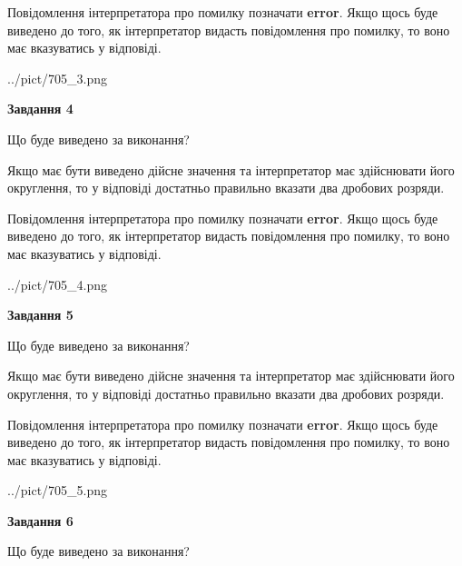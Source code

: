 \documentclass[12pt, ukrainian]{article}
\begin{document}
{\begin {Large}
Повідомлення інтерпретатора про помилку позначати \textbf{error}.
Якщо щось буде виведено до того, як інтерпретатор видасть повідомлення про помилку, 
то воно має вказуватись у відповіді. \par

\begin{center}
	{../pict/705_3.png}
\end{center}
\newpage

{\begin {center}\textbf{Завдання 4}\end {center}}\par
Що буде виведено за виконання? \par

Якщо має бути виведено дійсне значення та інтерпретатор має здійснювати його округлення, 
то у відповіді достатньо правильно вказати два дробових розряди.

Повідомлення інтерпретатора про помилку позначати \textbf{error}.
Якщо щось буде виведено до того, як інтерпретатор видасть повідомлення про помилку, 
то воно має вказуватись у відповіді. \par

\begin{center}
	{../pict/705_4.png}
\end{center}
\newpage

{\begin {center}\textbf{Завдання 5}\end {center}}\par
Що буде виведено за виконання? \par

Якщо має бути виведено дійсне значення та інтерпретатор має здійснювати його округлення, 
то у відповіді достатньо правильно вказати два дробових розряди.

Повідомлення інтерпретатора про помилку позначати \textbf{error}.
Якщо щось буде виведено до того, як інтерпретатор видасть повідомлення про помилку, 
то воно має вказуватись у відповіді. \par

\begin{center}
	{../pict/705_5.png}
\end{center}
\newpage

{\begin {center}\textbf{Завдання 6}\end {center}}\par
Що буде виведено за виконання? \par


\end{Large}}
\end{document}
